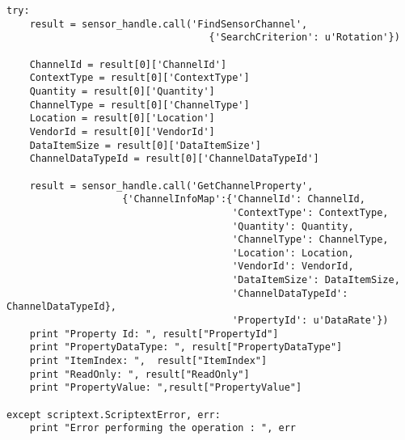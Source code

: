 \begin{verbatim}
try:
    result = sensor_handle.call('FindSensorChannel',
                                   {'SearchCriterion': u'Rotation'})

    ChannelId = result[0]['ChannelId']
    ContextType = result[0]['ContextType']
    Quantity = result[0]['Quantity']
    ChannelType = result[0]['ChannelType']
    Location = result[0]['Location']
    VendorId = result[0]['VendorId']
    DataItemSize = result[0]['DataItemSize']
    ChannelDataTypeId = result[0]['ChannelDataTypeId']

    result = sensor_handle.call('GetChannelProperty',
                    {'ChannelInfoMap':{'ChannelId': ChannelId,
                                       'ContextType': ContextType,
                                       'Quantity': Quantity,
                                       'ChannelType': ChannelType,
                                       'Location': Location,
                                       'VendorId': VendorId,
                                       'DataItemSize': DataItemSize,
                                       'ChannelDataTypeId': ChannelDataTypeId},
                                       'PropertyId': u'DataRate'})
    print "Property Id: ", result["PropertyId"]
    print "PropertyDataType: ", result["PropertyDataType"]
    print "ItemIndex: ",  result["ItemIndex"]
    print "ReadOnly: ", result["ReadOnly"]
    print "PropertyValue: ",result["PropertyValue"]

except scriptext.ScriptextError, err:
    print "Error performing the operation : ", err
\end{verbatim}

\pagebreak

